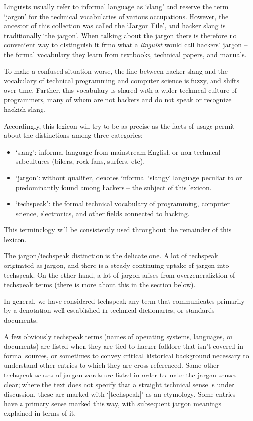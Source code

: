 Linguists usually refer to informal language as `slang' and reserve the term `jargon' for the technical vocabularies of various
occupations. However, the ancestor of this collection was called the `Jargon File', and hacker slang is traditionally `the jargon'. When
talking about the jargon there is therefore no convenient way to distinguish it frmo what a \textit{linguist} would call hackers' jargon
-- the formal vocabulary they learn from textbooks, technical papers, and manuals.

To make a confused situation worse, the line between hacker slang and the vocabulary of technical programming and computer science is
fuzzy, and shifts over time. Further, this vocabulary is shared with a wider technical culture of programmers, many of whom are not hackers
and do not speak or recognize hackish slang.

Accordingly, this lexicon will try to be as precise as the facts of usage permit about the distinctions among three categories:

\begin{itemize}
	\item `slang': informal language from mainstream English or non-technical subcultures (bikers, rock fans, surfers, etc).
	\item `jargon': without qualifier, denotes informal `slangy' language peculiar to or predominantly found among hackers -- the subject
		of this lexicon.
	\item `techspeak': the formal technical vocabulary of programming, computer science, electronics, and other fields connected to hacking.
\end{itemize}

This terminology will be consistently used throughout the remainder of this lexicon.

The jargon/techspeak distinction is the delicate one. A lot of techspeak originated as jargon, and there is a steady continuing uptake of
jargon into techspeak. On the other hand, a lot of jargon arises from overgeneraliztion of techspeak terms (there is more about this in the
 section below).

In general, we have considered techspeak any term that communicates primarily by a denotation well established in technical dictionaries,
or standards documents.

A few obviously techspeak terms (names of operating systems, languages, or documents) are listed when they are tied to hacker folklore that
isn't covered in formal sources, or sometimes to convey critical historical background necessary to understand other entries to which they
are cross-referenced. Some other techspeak senses of jargon words are listed in order to make the jargon senses clear; where the text does
not specify that a straight technical sense is under discussion, these are marked with `[techspeak]' as an etymology. Some entries have a
primary sense marked this way, with subsequent jargon meanings explained in terms of it.

